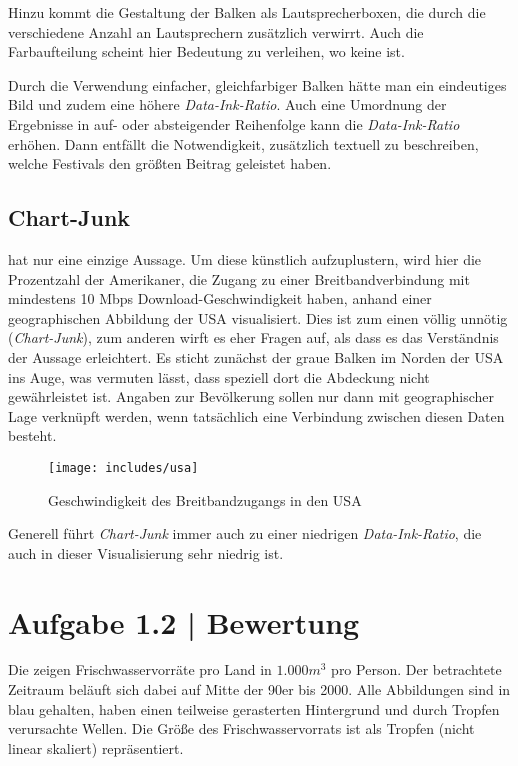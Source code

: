 \documentclass[a4paper,12pt,ngerman]{scrartcl}
\begin{document}
Hinzu kommt die Gestaltung der Balken als Lautsprecherboxen, die durch die verschiedene Anzahl an Lautsprechern zusätzlich verwirrt. Auch die Farbaufteilung scheint hier Bedeutung zu verleihen, wo keine ist.

Durch die Verwendung einfacher, gleichfarbiger Balken hätte man ein eindeutiges Bild und zudem eine höhere \emph{Data-Ink-Ratio}. Auch eine Umordnung der Ergebnisse in auf- oder absteigender Reihenfolge kann die \emph{Data-Ink-Ratio} erhöhen. Dann entfällt die Notwendigkeit, zusätzlich textuell zu beschreiben, welche Festivals den größten Beitrag geleistet haben.

\subsection*{Chart-Junk}

 hat nur eine einzige Aussage. Um diese künstlich aufzuplustern, wird hier die Prozentzahl der Amerikaner, die Zugang zu einer Breitbandverbindung mit mindestens 10 Mbps Download-Geschwindigkeit haben, anhand einer geographischen Abbildung der USA visualisiert. Dies ist zum einen völlig unnötig (\emph{Chart-Junk}), zum anderen wirft es eher Fragen auf, als dass es das Verständnis der Aussage erleichtert. Es sticht zunächst der graue Balken im Norden der USA ins Auge, was vermuten lässt, dass speziell dort die Abdeckung nicht gewährleistet ist. Angaben zur Bevölkerung sollen nur dann mit geographischer Lage verknüpft werden, wenn tatsächlich eine Verbindung zwischen diesen Daten besteht.

\begin{figure}[ht]
    \centering
    \texttt{[image: includes/usa]}
    \caption{Geschwindigkeit des Breitbandzugangs in den USA}
    \label{usa}
\end{figure}

Generell führt \emph{Chart-Junk} immer auch zu einer niedrigen \emph{Data-Ink-Ratio}, die auch in dieser Visualisierung sehr niedrig ist.

\section{Aufgabe 1.2 | Bewertung}

Die  zeigen Frischwasservorräte pro Land in $1.000 m^3$ pro Person. Der betrachtete Zeitraum beläuft sich dabei auf Mitte der 90er bis 2000. Alle Abbildungen sind in blau gehalten, haben einen teilweise gerasterten Hintergrund und durch Tropfen verursachte Wellen. Die Größe des Frischwasservorrats ist als Tropfen (nicht linear skaliert) repräsentiert.
\end{document}
